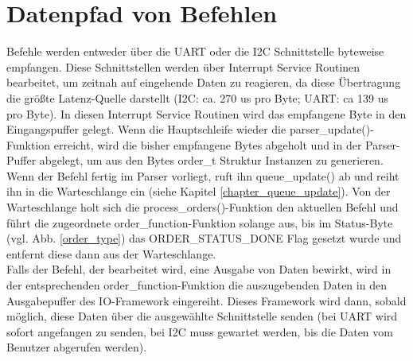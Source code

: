 \section{Datenpfad von Befehlen}
Befehle werden entweder über die UART oder die I2C Schnittstelle byteweise empfangen. Diese Schnittstellen werden über
Interrupt Service Routinen bearbeitet, um zeitnah auf eingehende Daten zu reagieren, da diese Übertragung die größte
Latenz-Quelle darstellt (I2C: ca. 270 us pro Byte; UART: ca 139 us pro Byte). In diesen Interrupt Service Routinen wird
das empfangene Byte in den Eingangspuffer gelegt. Wenn die Hauptschleife wieder die parser\_\-update()-Funktion erreicht,
wird die bisher empfangene Bytes abgeholt und in der Parser-Puffer abgelegt, um aus den Bytes order\_t Struktur Instanzen
zu generieren. Wenn der Befehl fertig im Parser vorliegt, ruft ihn queue\_\-update() ab und reiht ihn in die Warteschlange
ein (siehe Kapitel \ref{chapter_queue_update}). Von der Warteschlange holt sich die process\_\-orders()-Funktion den
aktuellen Befehl und führt die zugeordnete order\_function-Funktion solange aus, bis im Status-Byte (vgl. Abb. \ref{order_type})
das ORDER\_\-STATUS\_\-DONE Flag gesetzt wurde und entfernt diese dann aus der Warteschlange.\\
Falls der Befehl, der bearbeitet wird, eine Ausgabe von Daten bewirkt, wird in der entsprechenden order\_\-function-Funktion
die auszugebenden Daten in den Ausgabepuffer des IO-Framework eingereiht. Dieses Framework wird dann, sobald möglich, diese Daten
über die ausgewählte Schnittstelle senden (bei UART wird sofort angefangen zu senden, bei I2C muss gewartet werden, bis die Daten
vom Benutzer abgerufen werden).

